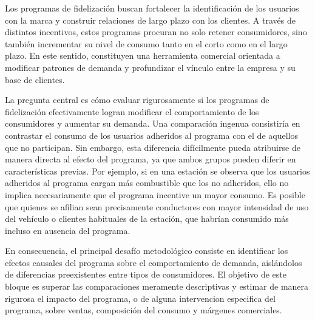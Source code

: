 



Los programas de fidelización buscan fortalecer la identificación de los usuarios con la marca y construir relaciones de largo plazo con los clientes. A través de distintos incentivos, estos programas procuran no solo retener consumidores, sino también incrementar su nivel de consumo tanto en el corto como en el largo plazo. En este sentido, constituyen una herramienta comercial orientada a modificar patrones de demanda y profundizar el vínculo entre la empresa y su base de clientes.

La pregunta central es cómo evaluar rigurosamente si los programas de fidelización efectivamente logran modificar el comportamiento de los consumidores y aumentar su demanda. Una comparación ingenua consistiría en contrastar el consumo de los usuarios adheridos al programa con el de aquellos que no participan. Sin embargo, esta diferencia difícilmente pueda atribuirse de manera directa al efecto del programa, ya que ambos grupos pueden diferir en características previas. Por ejemplo, si en una estación se observa que los usuarios adheridos al programa cargan más combustible que los no adheridos, ello no implica necesariamente que el programa incentive un mayor consumo. Es posible que quienes se afilian sean precisamente conductores con mayor intensidad de uso del vehículo o clientes habituales de la estación, que habrían consumido más incluso en ausencia del programa. 

En consecuencia, el principal desafío metodológico consiste en identificar los efectos causales del programa sobre el comportamiento de demanda, aislándolos de diferencias preexistentes entre tipos de consumidores. El objetivo de este bloque es superar las comparaciones meramente descriptivas y estimar de manera rigurosa el impacto del programa, o de alguna intervencion especifica del programa, sobre ventas, composición del consumo y márgenes comerciales. 

